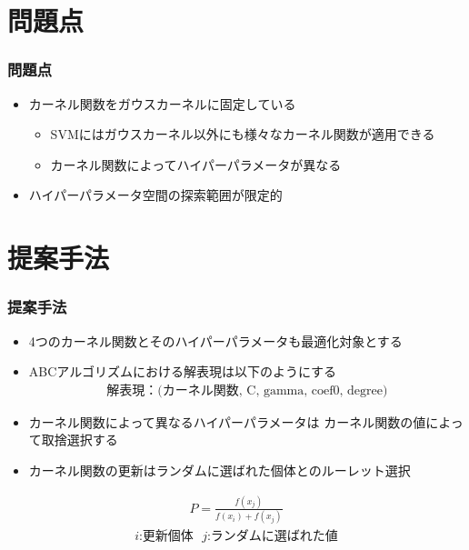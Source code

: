 \documentclass[11pt,dvipdfmx,cjk]{beamer}
\begin{document}
  \section{問題点}
  \begin{frame}
    \frametitle{問題点}
    \begin{itemize}
      \item カーネル関数をガウスカーネルに固定している
      \begin{itemize}
       \item SVMにはガウスカーネル以外にも様々なカーネル関数が適用できる      
      \item カーネル関数によってハイパーパラメータが異なる
    \end{itemize}
    \item ハイパーパラメータ空間の探索範囲が限定的
  \end{itemize}
\end{frame}
  
  \section{提案手法}
  \begin{frame}
    \frametitle{提案手法}
    \begin{itemize}
      \item 4つのカーネル関数とそのハイパーパラメータも最適化対象とする
      \item ABCアルゴリズムにおける解表現は以下のようにする
      \begin{align*}
        \text{解表現：(カーネル関数, C, gamma, coef0, degree)}
      \end{align*}
      \item カーネル関数によって異なるハイパーパラメータは
      カーネル関数の値によって取捨選択する 
      \item カーネル関数の更新はランダムに選ばれた個体とのルーレット選択  
    \end{itemize}
    \begin{align*}
      P = \frac{f(x_j)}{f(x_i)+f(x_j)}  
      \end{align*}
      \begin{align*}
      \text{$i$:更新個体~~$j$:ランダムに選ばれた値}
    \end{align*}
\end{frame}
  
  
\end{document}
